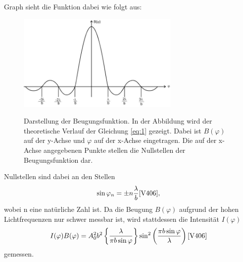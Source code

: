 \justifying Graph sieht die Funktion dabei wie folgt aus:
\begin{figure}[H]
    \centering
    \includegraphics[width=0.7\textwidth]{images/graph.jpg}
    \label{fig:2}
    \caption{Darstellung der Beugungsfunktion\cite{V406}.
    In der Abbildung wird der theoretische Verlauf der Gleichung \eqref{eq:1} gezeigt. 
    Dabei ist $B(\varphi)$ auf der y-Achse und $\varphi$ auf der x-Achse eingetragen.
    Die auf der x-Achse angegebenen Punkte stellen die Nullstellen der Beugungsfunktion dar.
    }
\end{figure}
\justifying Nullstellen sind dabei an den Stellen
\begin{align}
    \sin \varphi _n = \pm n \frac{\lambda}{b} \text{\cite{V406}} \label{eq:3},
\end{align}
wobei n eine natürliche Zahl ist.
Da die Beugung $B(\varphi)$ aufgrund der hohen Lichtfrequenzen nur schwer messbar ist,
wird stattdessen die Intensität $I(\varphi)$ 
\begin{align}
    I(\varphi)  B(\varphi) = A_0^2 b^2 \left\{\frac{\lambda}{\pi b \sin \varphi} \right\} \sin ^2 \left(\frac{\pi b \sin \varphi}{\lambda} \right) \text{\cite{V406}} \label{eq:4}
\end{align}
gemessen.\\


